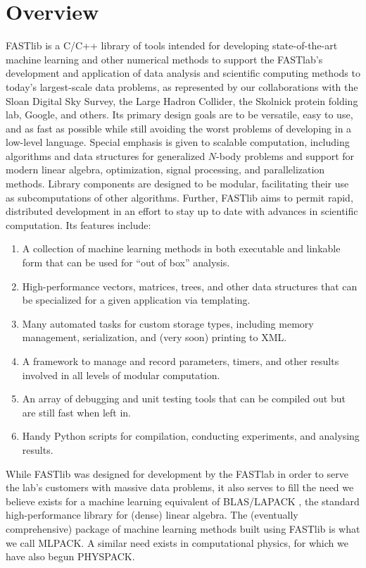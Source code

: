 \documentclass[letter]{report}
\begin{document}
\section {Overview}
FASTlib is a C/C++ library of tools intended for developing
state-of-the-art machine learning and other numerical methods to support
the FASTlab's development and application of data analysis and scientific
computing methods to today's largest-scale data problems, as represented
by our collaborations with the Sloan Digital Sky Survey, the Large Hadron 
Collider, the Skolnick protein folding lab, Google, and others.
Its primary design goals are to be versatile, easy to use, and as fast as
possible while still avoiding the worst problems of developing in a
low-level language.  Special emphasis is given to scalable
computation, including algorithms and data structures 
for generalized $N$-body problems
\cite{gray2000nbp} and support for modern linear algebra, optimization, 
signal processing, and parallelization methods.  Library
components are designed to be modular, facilitating their use as
subcomputations of other algorithms.  Further, FASTlib aims to permit
rapid, distributed development in an effort to stay up to date with
advances in scientific computation.  Its features include:
\begin{enumerate}
\item A collection of machine learning methods in both executable and
  linkable form that can be used for ``out of box'' analysis.
\item High-performance vectors, matrices, trees, and other data
  structures that can be specialized for a given application via
  templating.
\item Many automated tasks for custom storage types, including memory
  management, serialization, and (very soon) printing to XML.
\item A framework to manage and record parameters, timers, and other
  results involved in all levels of modular computation.
\item An array of debugging and unit testing tools that can be
  compiled out but are still fast when left in.
\item Handy Python scripts for compilation, conducting experiments,
  and analysing results.
\end{enumerate}
While FASTlib was designed for development by the FASTlab in order to 
serve the lab's customers with massive data problems, it also serves
to fill the need we believe exists for a machine learning equivalent
of BLAS/LAPACK \cite{anderson1999lug}, the standard 
high-performance library for (dense) linear algebra.  The (eventually 
comprehensive) package of 
machine learning methods built using FASTlib is what we call MLPACK.  A
similar need exists in computational physics, for which we have also begun
PHYSPACK.
\end{document}
